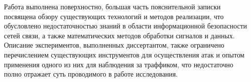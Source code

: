 \documentclass[ {{master thesis review}} ]{fefudoc}
\begin{document}
\Drawbacks
Работа выполнена поверхностно, большая часть пояснительной записки посвящена обзору существующих технологий и методов реализации, что обусловлено недостаточностью знаний в области информационной безопасности сетей связи, а также математических методов обработки сигналов и данных. Описание экспериментов, выполненных диссертантом, также ограничено перечислением существующих инструментов для осуществления атак и опытом применения одного из них для наблюдения за траффиком, что недостаточно полно отражает суть проводимого в работе исследования. 

\Defendable[да]


\Recomendations
\RecomendedForPublication
\end{document}
